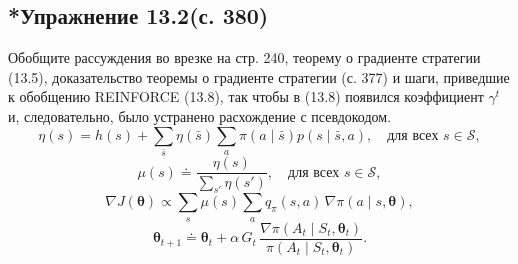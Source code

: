 \subsection{*Упражнение 13.2(с. 380)}
Обобщите рассуждения во врезке на стр. 240, теорему о градиенте стратегии
(13.5), доказательство теоремы о градиенте стратегии (с. 377) и шаги,
приведшие к обобщению REINFORCE (13.8), так чтобы в (13.8) появился
коэффициент $\gamma^t$ и, следовательно, было устранено расхождение
с псевдокодом.
\begin{equation}
    \eta(s) = h(s) + \sum_{\bar s}\eta(\bar s)\sum_a \pi(a\mid\bar s)p(s\mid\bar s,a),
    \quad\text{для всех } s\in\mathcal S,
    \tag{9.2}
\end{equation}
\begin{equation}
    \mu(s) \doteq \frac{\eta(s)}{\sum_{s'}\eta(s')},
    \quad\text{для всех } s\in\mathcal S,
    \tag{9.3}
\end{equation}
\begin{equation}
    \nabla J(\boldsymbol\theta) \propto
    \sum_s \mu(s)\sum_a q_\pi(s,a)\,\nabla\pi(a\mid s,\boldsymbol\theta),
    \tag{13.5}
\end{equation}
\begin{equation}
    \boldsymbol\theta_{t+1} \doteq \boldsymbol\theta_t
    + \alpha\,G_t\,\frac{\nabla\pi(A_t\mid S_t,\boldsymbol\theta_t)}{\pi(A_t\mid S_t,\boldsymbol\theta_t)}.
    \tag{13.8}
\end{equation}
